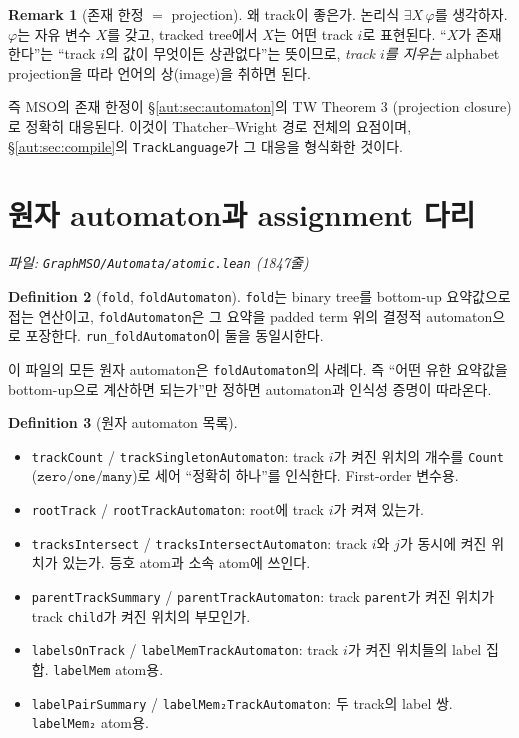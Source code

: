 \documentclass[11pt]{article}
\theoremstyle{definition}
\newtheorem{definition}{Definition}[section]
\newtheorem{remark}[definition]{Remark}
\theoremstyle{plain}
\newcommand{\MSO}{\mathrm{MSO}}
\newcommand{\lean}[1]{\texttt{#1}}
\newcommand{\leanfile}[1]{\texttt{#1}}
\newcommand{\TW}{Thatcher--Wright}
\begin{document}
\begin{remark}[존재 한정 $=$ projection]
\label{aut:rem:projectionidea}
왜 track이 좋은가. 논리식 $\exists X\, \varphi$를 생각하자. $\varphi$는 자유
변수 $X$를 갖고, tracked tree에서 $X$는 어떤 track $i$로 표현된다.
``$X$가 존재한다''는 ``track $i$의 값이 무엇이든 상관없다''는 뜻이므로,
\emph{track $i$를 지우는} alphabet projection을 따라 언어의 상(image)을 취하면
된다.

즉 $\MSO$의 존재 한정이 \S\ref{aut:sec:automaton}의 TW Theorem 3 (projection
closure)로 정확히 대응된다. 이것이 \TW{} 경로 전체의 요점이며,
\S\ref{aut:sec:compile}의 \lean{TrackLanguage}가 그 대응을 형식화한 것이다.
\end{remark}

\section{원자 automaton과 assignment 다리}
\label{aut:sec:atomic}

\emph{파일: \leanfile{GraphMSO/Automata/atomic.lean} (1847줄)}

\begin{definition}[\lean{fold}, \lean{foldAutomaton}]
\label{aut:def:fold}
\lean{fold}는 binary tree를 bottom-up 요약값으로 접는 연산이고,
\lean{foldAutomaton}은 그 요약을 padded term 위의 결정적 automaton으로
포장한다. \lean{run\_foldAutomaton}이 둘을 동일시한다.
\end{definition}

이 파일의 모든 원자 automaton은 \lean{foldAutomaton}의 사례다. 즉 ``어떤 유한
요약값을 bottom-up으로 계산하면 되는가''만 정하면 automaton과 인식성 증명이
따라온다.

\begin{definition}[원자 automaton 목록]
\label{aut:def:atomiclist}
\begin{itemize}
  \item \lean{trackCount} / \lean{trackSingletonAutomaton}: track $i$가 켜진
    위치의 개수를 \lean{Count} ($\lean{zero}/\lean{one}/\lean{many}$)로 세어
    ``정확히 하나''를 인식한다. First-order 변수용.
  \item \lean{rootTrack} / \lean{rootTrackAutomaton}: root에 track $i$가
    켜져 있는가.
  \item \lean{tracksIntersect} / \lean{tracksIntersectAutomaton}: track $i$와
    $j$가 동시에 켜진 위치가 있는가. 등호 atom과 소속 atom에 쓰인다.
  \item \lean{parentTrackSummary} / \lean{parentTrackAutomaton}: track
    \lean{parent}가 켜진 위치가 track \lean{child}가 켜진 위치의 부모인가.
  \item \lean{labelsOnTrack} / \lean{labelMemTrackAutomaton}: track $i$가
    켜진 위치들의 label 집합. \lean{labelMem} atom용.
  \item \lean{labelPairSummary} / \lean{labelMem₂TrackAutomaton}:
    두 track의 label 쌍. \lean{labelMem₂} atom용.
\end{itemize}
\end{definition}
\end{document}
